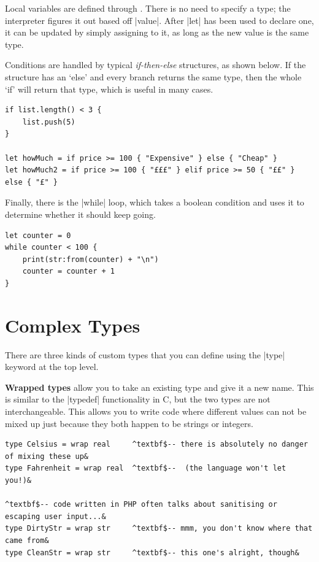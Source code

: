 \documentclass[11pt]{report}
\begin{document}
Local variables are defined through . There is no need to specify a type; the interpreter figures it out based off |value|. After |let| has been used to declare one, it can be updated by simply assigning to it, as long as the new value is the same type.

Conditions are handled by typical \emph{if-then-else} structures, as shown below. If the structure has an `else' and every branch returns the same type, then the whole `if' will return that type, which is useful in many cases.

\begin{Verbatim}
if list.length() < 3 {
    list.push(5)
}

let howMuch = if price >= 100 { "Expensive" } else { "Cheap" }
let howMuch2 = if price >= 100 { "£££" } elif price >= 50 { "££" } else { "£" }
\end{Verbatim}

Finally, there is the |while| loop, which takes a boolean condition and uses it to determine whether it should keep going.

\begin{Verbatim}
let counter = 0
while counter < 100 {
    print(str:from(counter) + "\n")
    counter = counter + 1
}
\end{Verbatim}

\section{Complex Types}

There are three kinds of custom types that you can define using the |type| keyword at the top level.

\textbf{Wrapped types} allow you to take an existing type and give it a new name. This is similar to the |typedef| functionality in C, but the two types are not interchangeable. This allows you to write code where different values can not be mixed up just because they both happen to be strings or integers.

\begin{Verbatim}[commandchars=^$&]
type Celsius = wrap real     ^textbf$-- there is absolutely no danger of mixing these up&
type Fahrenheit = wrap real  ^textbf$--  (the language won't let you!)&

^textbf$-- code written in PHP often talks about sanitising or escaping user input...&
type DirtyStr = wrap str     ^textbf$-- mmm, you don't know where that came from&
type CleanStr = wrap str     ^textbf$-- this one's alright, though&
\end{Verbatim}
\end{document}
